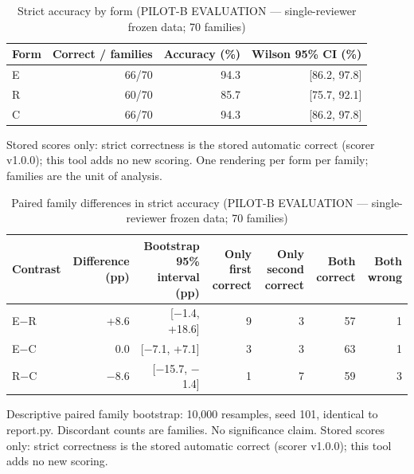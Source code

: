 \begin{table}[t]
\centering
\small
\caption{Strict accuracy by form (PILOT-B EVALUATION --- single-reviewer frozen data; 70 families)}
\label{tab:pilotb-Qwen3-4B-accuracy}
\begin{tabular}{lrrr}
\toprule
Form & Correct / families & Accuracy (\%) & Wilson 95\% CI (\%) \\
\midrule
E & 66/70 & 94.3 & [86.2, 97.8] \\
R & 60/70 & 85.7 & [75.7, 92.1] \\
C & 66/70 & 94.3 & [86.2, 97.8] \\
\bottomrule
\end{tabular}
\par\smallskip
\parbox{\linewidth}{\footnotesize Stored scores only: strict correctness is the stored automatic correct (scorer v1.0.0); this tool adds no new scoring. One rendering per form per family; families are the unit of analysis.}
\end{table}

\begin{table}[t]
\centering
\small
\caption{Paired family differences in strict accuracy (PILOT-B EVALUATION --- single-reviewer frozen data; 70 families)}
\label{tab:pilotb-Qwen3-4B-paired}
\begin{tabular}{lrrrrrr}
\toprule
Contrast & Difference (pp) & Bootstrap 95\% interval (pp) & Only first correct & Only second correct & Both correct & Both wrong \\
\midrule
E$-$R & +8.6 & [$-$1.4, +18.6] & 9 & 3 & 57 & 1 \\
E$-$C & 0.0 & [$-$7.1, +7.1] & 3 & 3 & 63 & 1 \\
R$-$C & $-$8.6 & [$-$15.7, $-$1.4] & 1 & 7 & 59 & 3 \\
\bottomrule
\end{tabular}
\par\smallskip
\parbox{\linewidth}{\footnotesize Descriptive paired family bootstrap: 10,000 resamples, seed 101, identical to report.py. Discordant counts are families. No significance claim. Stored scores only: strict correctness is the stored automatic correct (scorer v1.0.0); this tool adds no new scoring.}
\end{table}


